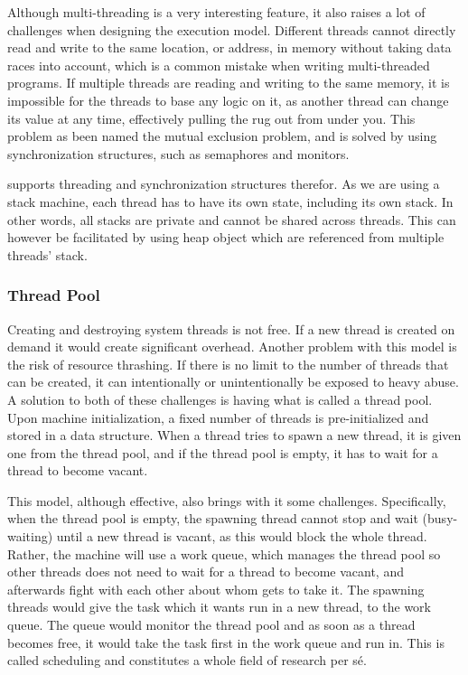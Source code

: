 Although multi-threading is a very interesting feature, it also raises a lot of
challenges when designing the execution model. Different threads cannot directly
read and write to the same location, or address, in memory without taking data
races into account, which is a common mistake when writing multi-threaded
programs. If multiple threads are reading and writing to the same memory, it is
impossible for the threads to base any logic on it, as another thread can change
its value at any time, effectively pulling the rug out from under you. This
problem as been named the mutual exclusion problem, and is solved by using
synchronization structures, such as semaphores and monitors.

\thename{} supports threading and synchronization structures therefor. As we are
using a stack machine, each thread has to have its own state, including its own
stack. In other words, all stacks are private and cannot be shared across
threads. This can however be facilitated by using heap object which are
referenced from multiple threads' stack.

\subsubsection{Thread Pool}

Creating and destroying system threads is not free. If a new thread is created
on demand it would create significant overhead. Another problem with this model
is the risk of resource thrashing. If there is no limit to the number of threads
that can be created, it can intentionally or unintentionally be exposed to heavy
abuse. A solution to both of these challenges is having what is called a thread
pool. Upon machine initialization, a fixed number of threads is pre-initialized
and stored in a data structure. When a thread tries to spawn a new thread, it is
given one from the thread pool, and if the thread pool is empty, it has to wait
for a thread to become vacant.

This model, although effective, also brings with it some
challenges. Specifically, when the thread pool is empty, the spawning thread
cannot stop and wait (busy-waiting) until a new thread is vacant, as this would
block the whole thread. Rather, the machine will use a work queue, which manages
the thread pool so other threads does not need to wait for a thread to become
vacant, and afterwards fight with each other about whom gets to take it. The
spawning threads would give the task which it wants run in a new thread, to the
work queue. The queue would monitor the thread pool and as soon as a thread
becomes free, it would take the task first in the work queue and run in. This is
called scheduling and constitutes a whole field of research per s\'e.

